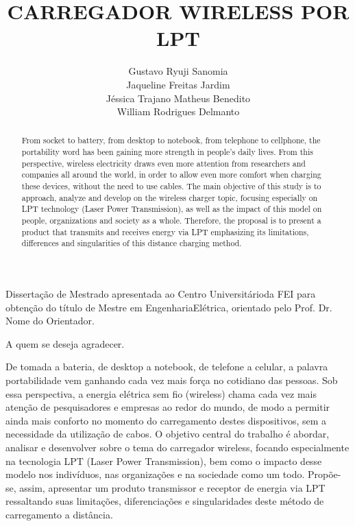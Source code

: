 \documentclass{fei}
\title{CARREGADOR WIRELESS POR LPT}
\author{
	Gustavo Ryuji Sanomia\\
	Jaqueline Freitas Jardim\\
	Jéssica Trajano Matheus Benedito\\
	William Rodrigues Delmanto
}
\begin{document}
\maketitle

\begin{folhaderosto}
Dissertação de Mestrado apresentada ao Centro Universitárioda FEI para obtenção do título de Mestre em EngenhariaElétrica, orientado pelo Prof. Dr. Nome do Orientador.
\end{folhaderosto}

\fichacatalografica
\folhadeaprovacao


\begin{agradecimentos}
A quem se deseja agradecer.
\end{agradecimentos}

\begin{resumo}
De tomada a bateria, de desktop a notebook, de telefone a celular, a palavra portabilidade vem ganhando cada vez mais força no cotidiano das pessoas. Sob essa perspectiva, a energia elétrica sem fio (wireless) chama cada vez mais atenção de pesquisadores e empresas ao redor do mundo, de modo a permitir ainda mais conforto no momento do carregamento destes dispositivos, sem a necessidade da utilização de cabos. O objetivo central do trabalho é abordar, analisar e desenvolver sobre o tema do carregador wireless, focando especialmente na tecnologia LPT (Laser Power Transmission), bem como o impacto desse modelo nos indivíduos, nas organizações e na sociedade como um todo. Propõe-se, assim, apresentar um produto transmissor e receptor de energia via LPT ressaltando suas limitações, diferenciações e singularidades deste método de carregamento a distância.
\end{resumo}

\begin{abstract}
From socket to battery, from desktop to notebook, from telephone to cellphone, the portability word has been gaining more strength in people's daily lives. From this perspective, wireless electricity draws even more attention from researchers and companies all around the world, in order to allow even more comfort when charging these devices, without the need to use cables. The main objective of this study is to approach, analyze and develop on the wireless charger topic, focusing especially on LPT technology (Laser Power Transmission), as well as the impact of this model on people, organizations and society as a whole. Therefore, the proposal is to present a product that transmits and receives energy via LPT emphasizing its limitations, differences and singularities of this distance charging method.
\end{abstract}
\end{document}
